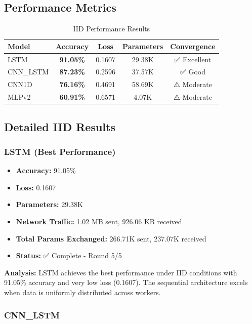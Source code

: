\documentclass[12pt,a4paper]{article}
\begin{document}
\subsection{Performance Metrics}

\begin{table}[h]
\centering
\begin{tabular}{@{}lcccc@{}}
\toprule
\textbf{Model} & \textbf{Accuracy} & \textbf{Loss} & \textbf{Parameters} & \textbf{Convergence} \\
\midrule
LSTM & \textbf{91.05\%} & 0.1607 & 29.38K & ✅ Excellent \\
CNN\_LSTM & \textbf{87.23\%} & 0.2596 & 37.57K & ✅ Good \\
CNN1D & \textbf{76.16\%} & 0.4691 & 58.69K & ⚠️ Moderate \\
MLPv2 & \textbf{60.91\%} & 0.6571 & 4.07K & ⚠️ Moderate \\
\bottomrule
\end{tabular}
\caption{IID Performance Results}
\end{table}

\subsection{Detailed IID Results}

\subsubsection{LSTM (Best Performance)}

\begin{itemize}
    \item \textbf{Accuracy:} 91.05\%
    \item \textbf{Loss:} 0.1607
    \item \textbf{Parameters:} 29.38K
    \item \textbf{Network Traffic:} 1.02 MB sent, 926.06 KB received
    \item \textbf{Total Params Exchanged:} 266.71K sent, 237.07K received
    \item \textbf{Status:} ✅ Complete - Round 5/5
\end{itemize}

\textbf{Analysis:} LSTM achieves the best performance under IID conditions with 91.05\% accuracy and very low loss (0.1607). The sequential architecture excels when data is uniformly distributed across workers.

\subsubsection{CNN\_LSTM}
\end{document}
